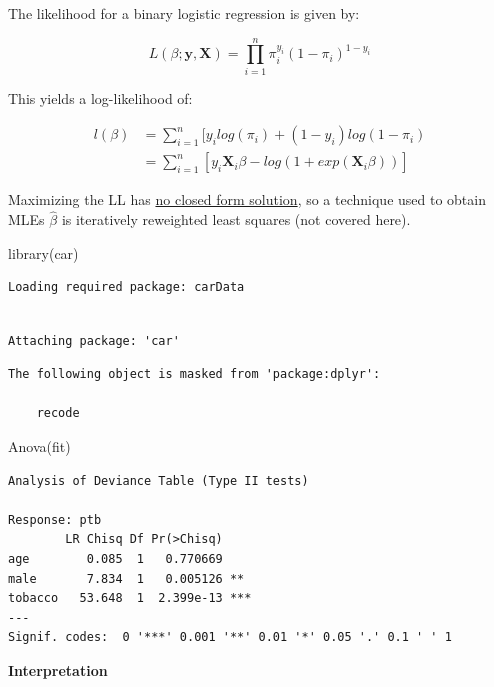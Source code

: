 \documentclass[
  letterpaper,
  DIV=11,
  numbers=noendperiod]{scrreprt}
\newenvironment{Shaded}{\begin{snugshade}}{\end{snugshade}}
\newcommand{\FunctionTok}[1]{\textcolor[rgb]{0.28,0.35,0.67}{#1}}
\newcommand{\NormalTok}[1]{\textcolor[rgb]{0.00,0.23,0.31}{#1}}
\begin{document}
The likelihood for a binary logistic regression is given by:

\[
L(\beta; \mathbf{y}, \mathbf{X}) = \prod_{i=1}^{n} \pi_i^{y_i} (1-\pi_i)^{1-y_i}
\]

This yields a log-likelihood of:

\[
\begin{align*}
l(\beta) &= \sum_{i=1}^n [y_i log(\pi_i)  + (1-y_i) log(1-\pi_i)\\
&= \sum_{i=1}^n [y_i \mathbf{X}_i \beta - log(1+ exp(\mathbf{X}_i \beta))]
\end{align*}
\]

Maximizing the LL has \ul{no closed form solution}, so a technique used
to obtain MLEs \(\hat{\beta}\) is iteratively reweighted least squares
(not covered here).

\begin{Shaded}
\begin{Highlighting}[]
\FunctionTok{library}\NormalTok{(car)}
\end{Highlighting}
\end{Shaded}

\begin{verbatim}
Loading required package: carData
\end{verbatim}

\begin{verbatim}

Attaching package: 'car'
\end{verbatim}

\begin{verbatim}
The following object is masked from 'package:dplyr':

    recode
\end{verbatim}

\begin{Shaded}
\begin{Highlighting}[]
\FunctionTok{Anova}\NormalTok{(fit)}
\end{Highlighting}
\end{Shaded}

\begin{verbatim}
Analysis of Deviance Table (Type II tests)

Response: ptb
        LR Chisq Df Pr(>Chisq)    
age        0.085  1   0.770669    
male       7.834  1   0.005126 ** 
tobacco   53.648  1  2.399e-13 ***
---
Signif. codes:  0 '***' 0.001 '**' 0.01 '*' 0.05 '.' 0.1 ' ' 1
\end{verbatim}

\textbf{Interpretation}
\end{document}
